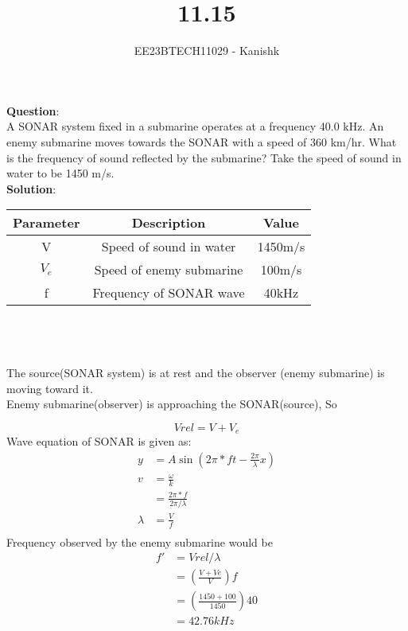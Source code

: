 \documentclass[journal,12pt,twocolumn]{IEEEtran}
\theoremstyle{remark}
\begin{document}

\vspace{3cm}

\title{11.15}
\author{EE23BTECH11029 - Kanishk}
\maketitle
\newpage

\bigskip

\renewcommand{\thefigure}{\theenumi}
\renewcommand{\thetable}{\theenumi}
\small
\textbf{Question}:\\ 
A SONAR system fixed in a submarine operates at a frequency 40.0 kHz. An enemy submarine moves towards the SONAR with a speed of 360 km/hr. What is the frequency of sound reflected by the submarine? Take the speed of sound in water to be 1450 m/s.\\

\textbf{Solution}:\\

\begin{tabular}{|c|c|c|}
   \hline
   Parameter & Description & Value\\
   \hline
   V & Speed of sound in water & 1450m/s\\
   \hline 
   $V_e$ & Speed of enemy submarine & 100m/s\\
   \hline 
   f & Frequency of SONAR wave & 40kHz\\
   \hline
\end{tabular}   
\\
\\
\\
The source(SONAR system) is at rest and the observer (enemy submarine) is moving toward it. \\
Enemy submarine(observer) is approaching the SONAR(source), So 

\begin{equation}
Vrel=V+V_e
\end{equation}
Wave equation of SONAR is given as:\\
\begin{align}
y&=A\sin(2\pi*ft-\frac{2\pi}{\lambda}x)\\
v&=\frac{\omega}{k}\\
&=\frac{2\pi*f}{2\pi/\lambda}\\
\lambda&=\frac{V}{f}\\
\end{align}
Frequency observed by the enemy submarine would be
\begin{align}
f'&=Vrel/\lambda\\
&=(\frac{V+Ve}{V})f\\
&= (\frac{1450+100}{1450})40\\
&=42.76kHz
\end{align}
\end{document}
